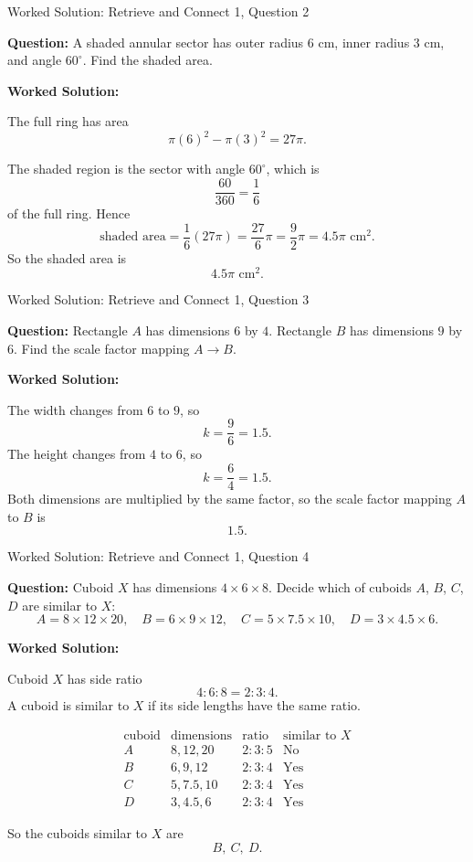 \documentclass{beamer}
\begin{document}
\begin{frame}{Worked Solution: Retrieve and Connect 1, Question 2}

\textbf{Question:} A shaded annular sector has outer radius \(6\) cm, inner radius \(3\) cm, and angle \(60^\circ\). Find the shaded area.

\textbf{Worked Solution:}

The full ring has area
\[
\pi(6)^2-\pi(3)^2=27\pi.
\]

The shaded region is the sector with angle \(60^\circ\), which is
\[
\frac{60}{360}=\frac16
\]
of the full ring. Hence
\[
\text{shaded area}
=\frac16(27\pi)
=\frac{27}{6}\pi
=\frac{9}{2}\pi
=4.5\pi\text{ cm}^2.
\]
So the shaded area is
\[
\boxed{4.5\pi\text{ cm}^2}.
\]

\end{frame}

\begin{frame}{Worked Solution: Retrieve and Connect 1, Question 3}

\textbf{Question:} Rectangle \(A\) has dimensions \(6\) by \(4\). Rectangle \(B\) has dimensions \(9\) by \(6\). Find the scale factor mapping \(A\to B\).

\textbf{Worked Solution:}

The width changes from \(6\) to \(9\), so
\[
k=\frac{9}{6}=1.5.
\]
The height changes from \(4\) to \(6\), so
\[
k=\frac{6}{4}=1.5.
\]
Both dimensions are multiplied by the same factor, so the scale factor mapping \(A\) to \(B\) is
\[
\boxed{1.5}.
\]

\end{frame}

\begin{frame}{Worked Solution: Retrieve and Connect 1, Question 4}

\textbf{Question:} Cuboid \(X\) has dimensions \(4\times6\times8\). Decide which of cuboids \(A\), \(B\), \(C\), \(D\) are similar to \(X\):
\[
A=8\times12\times20,\quad B=6\times9\times12,\quad C=5\times7.5\times10,\quad D=3\times4.5\times6.
\]

\textbf{Worked Solution:}

Cuboid \(X\) has side ratio
\[
4:6:8=2:3:4.
\]
A cuboid is similar to \(X\) if its side lengths have the same ratio.

\[
\begin{array}{c|c|c|c}
\text{cuboid} & \text{dimensions} & \text{ratio} & \text{similar to }X\\ \hline
A & 8,12,20 & 2:3:5 & \text{No}\\
B & 6,9,12 & 2:3:4 & \text{Yes}\\
C & 5,7.5,10 & 2:3:4 & \text{Yes}\\
D & 3,4.5,6 & 2:3:4 & \text{Yes}
\end{array}
\]

So the cuboids similar to \(X\) are
\[
\boxed{B,\ C,\ D}.
\]

\end{frame}
\end{document}
